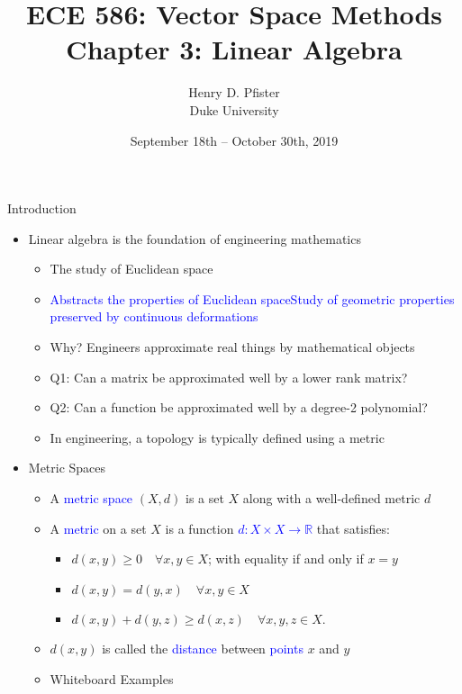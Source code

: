 \documentclass[10pt,letterpaper,english]{beamer}
\newif\ifslow
\begin{document}
\ifslow

\title{ECE 586: Vector Space Methods \\ Chapter 3: Linear Algebra}
\author{Henry D. Pfister \\ Duke University}
\date{September 18th -- October 30th, 2019}
\maketitle

\iffalse

\begin{frame}{Introduction}

\begin{itemize}
\setlength\itemsep{3mm}
\item<1-> Linear algebra is the foundation of engineering mathematics \vspace{1mm}
\begin{itemize} 
  \setlength\itemsep{1.5mm}
  \item The study of Euclidean space  
  \item<1-> \textcolor{blue}{Abstracts the properties of Euclidean spaceStudy of geometric properties preserved by continuous deformations}
  \item<2-> Why? Engineers approximate real things by mathematical objects
  \item<2-> Q1: Can a matrix be approximated well by a lower rank matrix?
  \item<2-> Q2: Can a function be approximated well by a degree-2 polynomial?
  \item<2-> In engineering, a topology is typically defined using a metric
\end{itemize}

\vspace{1mm}

\item<3-> Metric Spaces \vspace{1mm}
\begin{itemize} 
  \setlength\itemsep{1.5mm}
  \item A \textcolor{blue}{metric space} $(X,d)$ is a set $X$ along with a well-defined metric $d$
  \item A \textcolor{blue}{metric} on a set $X$ is a function \textcolor{blue}{$d \colon X \times X \rightarrow \mathbb{R} $} that satisfies: \vspace{1mm}
  \begin{itemize}
  \setlength\itemsep{1.5mm}
  \item $d(x,y) \geq 0 \quad \forall x, y \in X$; with equality if and only if $x = y$
  \item $d(x,y) = d(y,x) \quad \forall x, y \in X$
  \item $d(x,y) + d(y,z) \geq d(x,z) \quad \forall x, y, z \in X$.
  \end{itemize}
  \item $d(x,y)$ is called the \textcolor{blue}{distance} between \textcolor{blue}{points} $x$ and $y$
  \item Whiteboard Examples
\end{itemize}
\end{itemize}
\end{frame}
\end{document}
